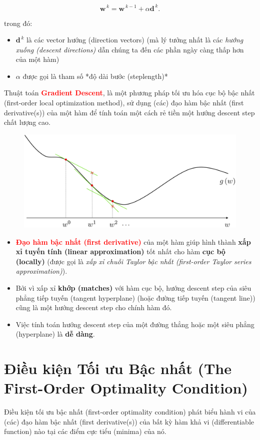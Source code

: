 \documentclass{book}
\begin{document}
\begin{equation*}
\mathbf{w}^{\,k} = \mathbf{w}^{\,k-1} + \alpha \mathbf{d}^{\,k}.
\end{equation*}

trong đó:
\begin{itemize}
    \item $\mathbf{d}^{\,k}$ là các vector hướng (direction vectors) (mà lý tưởng nhất là các \textit{hướng xuống (descent directions)} dẫn chúng ta đến các phần ngày càng thấp hơn của một hàm)
    \item $\alpha$ được gọi là tham số *độ dài bước (steplength)*
\end{itemize}
Thuật toán \textbf{\textcolor{red}{Gradient Descent}}, là một phương pháp tối ưu hóa cục bộ bậc nhất (first-order local optimization method), sử dụng (các) đạo hàm bậc nhất (first derivative(s)) của một hàm để tính toán một cách rẻ tiền một hướng descent step chất lượng cao.
\begin{figure}[H]
    \centering
    \includegraphics[width=\textwidth]{images/gradient_descent.png}
\end{figure}
\begin{itemize}
    \item \textbf{\textcolor{red}{Đạo hàm bậc nhất (first derivative)}} của một hàm giúp hình thành \textbf{xấp xỉ tuyến tính (linear approximation)} tốt nhất cho hàm \textbf{cục bộ (locally)} (được gọi là \textit{xấp xỉ chuỗi Taylor bậc nhất (first-order Taylor series approximation)}).
    \item Bởi vì xấp xỉ \textbf{khớp (matches)} với hàm cục bộ, hướng descent step của siêu phẳng tiếp tuyến (tangent hyperplane) (hoặc đường tiếp tuyến (tangent line)) cũng là một hướng descent step cho chính hàm đó.
    \item Việc tính toán hướng descent step của một đường thẳng hoặc một siêu phẳng (hyperplane) là \textbf{dễ dàng}.
\end{itemize}
\section{Điều kiện Tối ưu Bậc nhất (The First-Order Optimality Condition)}
Điều kiện tối ưu bậc nhất (first-order optimality condition) phát biểu hành vi của (các) đạo hàm bậc nhất (first derivative(s)) của bất kỳ hàm khả vi (differentiable function) nào tại các điểm cực tiểu (minima) của nó.
\end{document}
